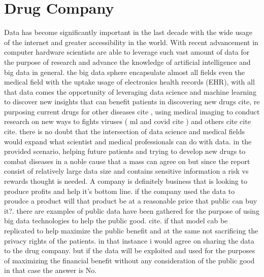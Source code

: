 \documentclass{article}
\begin{document}

\section{Drug Company}  
Data has become significantly important in the last decade with the wide usage of the internet and greater accessibility in the world. With recent advancement in computer hardware scientists are able to leverage such vast amount of data for the purpose of research and advance the knowledge of artificial intelligence and big data in general. the big data sphere encapsulate almost all fields even the medical field with the uptake usage of electronics health records (EHR), with all that data comes the opportunity of leveraging data science and machine learning to discover new insights that can benefit patients in discovering new drugs cite, re purposing current drugs for other diseases cite , using  medical imaging to conduct research on new ways to fights viruses ( ml and covid cite ) and others cite cite cite. there is no doubt that the intersection of data science and medical fields would expand what scientist and medical professionals can do with data. in the provided scenario, helping future patients and trying to develop new drugs to combat diseases in a noble cause that a mass can  agree on but since the report consist of relatively large data size and contains sensitive information a risk vs rewards thought is needed. A company is definitely business that is looking to produce profits and help it's bottom line. if the company used the data to proudce a product will that product be at a reasonable price that public can buy it?. there are examples of public data have been gathered for the purpose of using big data technologies to help the public good. cite. if that model cab be replicated to help maximize the public benefit and at the same not sacrificing the privacy rights of the patients. in that instance i would agree on sharing the data to the drug company. but if the data will be exploited and used for the purposes of maximizing the financial benefit without any consideration of the public good in that case the answer is No. 




\newpage
 

\end{document}
